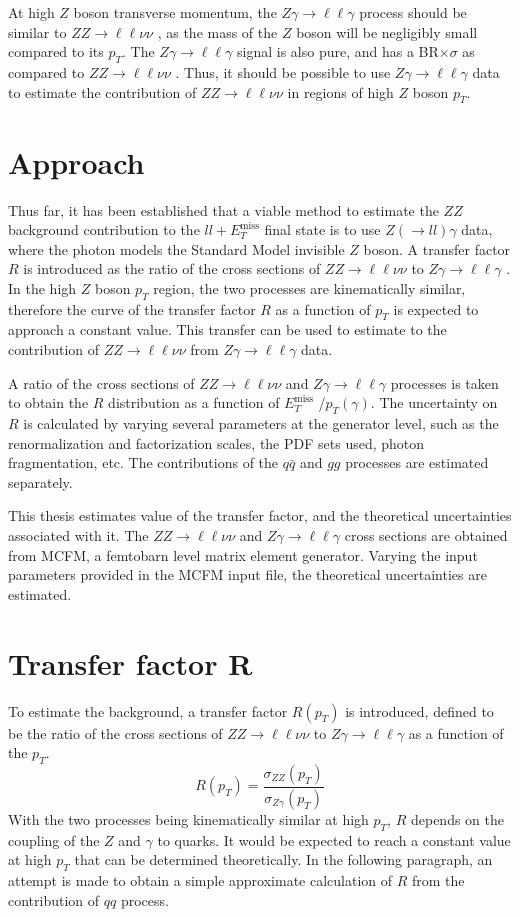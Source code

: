 \documentclass[11pt,a4paper,openright,twoside]{report}
\newcommand{\ZZ}{$ZZ\to \ell\ell\nu\nu$ }
\newcommand{\Zg}{$Z\gamma\to \ell\ell\gamma$ }
\newcommand{\met}{$E_T^{\mathrm{miss}}$ }
\begin{document}
At high $Z $ boson transverse momentum, the \Zg process should be similar to \ZZ, as the mass of the $Z$ boson will be negligibly small compared to its $p_T$. The \Zg signal is also pure, and has a BR$\times\sigma$ as compared to \ZZ. Thus, it should be possible to use \Zg data to estimate the contribution of \ZZ in regions of high $Z$ boson $p_T$.

\section{Approach}
Thus far, it has been established that a viable method to estimate the $ZZ$ background contribution to the $ll+$\met final state is to use $Z(\to ll)\gamma$ data, where the photon models the Standard Model invisible $Z$ boson. A transfer factor $R$ is introduced as the ratio of the cross sections of \ZZ to \Zg. In the high $Z$ boson $p_T$ region, the two processes are kinematically similar, therefore the curve of the transfer factor $R$ as a function of $p_T$ is expected to approach a constant value. This transfer can be used to estimate to the contribution of \ZZ from \Zg data.

A ratio of the cross sections of \ZZ and \Zg processes is taken to obtain the $R$ distribution as a function of \met/$p_T(\gamma)$. The uncertainty on $R$ is calculated by varying several parameters at the generator level, such as the renormalization and factorization scales, the PDF sets used, photon fragmentation, etc. The contributions of the $q \bar{q}$ and $gg$ processes are estimated separately.

This thesis estimates value of the transfer factor, and the theoretical uncertainties associated with it. The \ZZ and \Zg cross sections are obtained from MCFM, a femtobarn level matrix element generator. Varying the input parameters provided in the MCFM input file, the theoretical uncertainties are estimated.

\section{Transfer factor R}\label{sec:R}
To estimate the background, a transfer factor $R(p_T)$ is introduced, defined to be the ratio of the cross sections of \ZZ to \Zg as a function of the $p_T$.
\begin{equation}
	R(p_{T}) = \frac{\sigma_{ZZ}(p_{T})}{\sigma_{Z\gamma}(p_T)}
\end{equation}
With the two processes being kinematically similar at high $p_T$, $R$ depends on the coupling of the $Z$ and $\gamma$ to quarks. It would be expected to reach a constant value at high $p_T$ that can be determined theoretically. In the following paragraph, an attempt is made to obtain a simple approximate calculation of $R$ from the contribution of $qq$ process.
\end{document}
